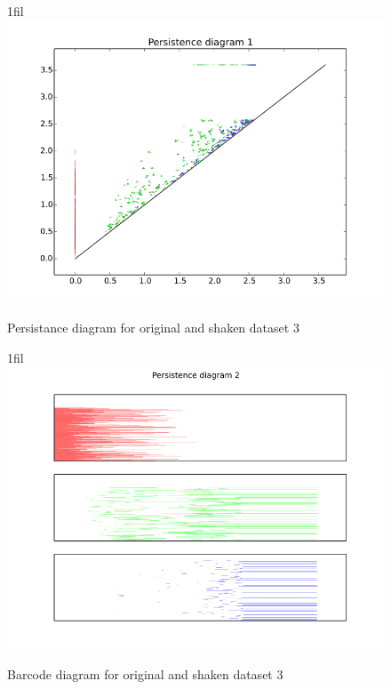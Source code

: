 \documentclass[11pt]{article}
\makeatletter
\newcommand*{\centerfloat}{
  \parindent \z@
  \leftskip \z@ \@plus 1fil \@minus \textwidth
  \rightskip\leftskip
  \parfillskip \z@skip}
\makeatother
\begin{document}
\begin{figure}[H]
   \centerfloat
   \includegraphics[width=1.2\textwidth]{data3_d2_6_pers.png}
   \caption{Persistance diagram for original and shaken dataset 3}
   \label{data3_pers}
\end{figure}

\begin{figure}[H]
   \centerfloat
   \includegraphics[width=1.2\textwidth]{data3_d2_6_bar.png}
   \caption{Barcode diagram for original and shaken dataset 3}
   \label{data3_bar}
\end{figure}
\end{document}
